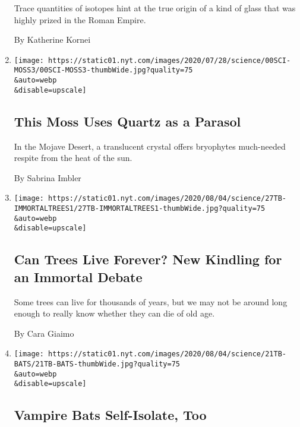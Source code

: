 \begin{enumerate}
  Trace quantities of isotopes hint at the true origin of a kind of
  glass that was highly prized in the Roman Empire.

  By Katherine Kornei
\item
  \href{/2020/07/29/science/moss-quartz-biology-syntrichia.html}{}

  \texttt{[image: https://static01.nyt.com/images/2020/07/28/science/00SCI-MOSS3/00SCI-MOSS3-thumbWide.jpg?quality=75\\\&auto=webp\\\&disable=upscale]}

  \hypertarget{this-moss-uses-quartz-as-a-parasol}{%
  \subsection{This Moss Uses Quartz as a
  Parasol}\label{this-moss-uses-quartz-as-a-parasol}}

  In the Mojave Desert, a translucent crystal offers bryophytes
  much-needed respite from the heat of the sun.

  By Sabrina Imbler
\item
  \href{/2020/07/27/science/trees-immortality.html}{}

  \texttt{[image: https://static01.nyt.com/images/2020/08/04/science/27TB-IMMORTALTREES1/27TB-IMMORTALTREES1-thumbWide.jpg?quality=75\\\&auto=webp\\\&disable=upscale]}

  \hypertarget{can-trees-live-forever-new-kindling-for-an-immortal-debate}{%
  \subsection{Can Trees Live Forever? New Kindling for an Immortal
  Debate}\label{can-trees-live-forever-new-kindling-for-an-immortal-debate}}

  Some trees can live for thousands of years, but we may not be around
  long enough to really know whether they can die of old age.

  By Cara Giaimo
\item
  \href{/2020/07/22/science/vampire-bats-viruses.html}{}

  \texttt{[image: https://static01.nyt.com/images/2020/08/04/science/21TB-BATS/21TB-BATS-thumbWide.jpg?quality=75\\\&auto=webp\\\&disable=upscale]}

  \hypertarget{vampire-bats-self-isolate-too}{%
  \subsection{Vampire Bats Self-Isolate,
  Too}\label{vampire-bats-self-isolate-too}}


\end{enumerate}
